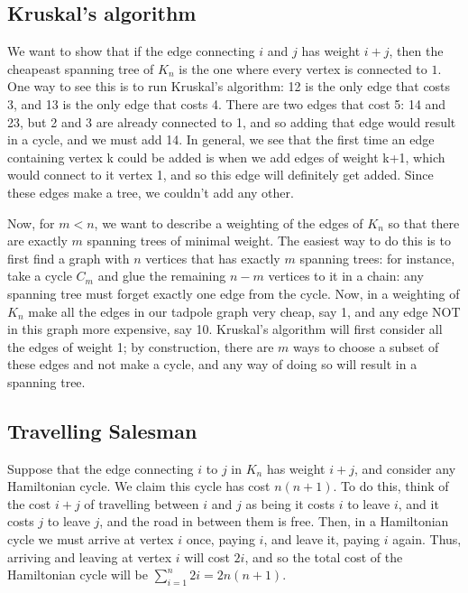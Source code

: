 \documentclass{amsart}
\begin{document}
\subsection{Kruskal's algorithm}

We want to show that if the edge connecting $i$ and $j$ has weight $i+j$, then the cheapeast spanning tree of $K_n$ is the one where every vertex is connected to $1$.  One way to see this is to run Kruskal's algorithm:  12 is the only edge that costs 3, and 13 is the only edge that costs 4.  There are two edges that cost 5: 14 and 23, but 2 and 3 are already connected to 1, and so adding that edge would result in a cycle, and we must add 14.  In general, we see that the first time an edge containing vertex k could be added is when we add edges of weight k+1, which would connect to it vertex 1, and so this edge will definitely get added.  Since these edges make a tree, we couldn't add any other.

Now, for $m<n$, we want to describe a weighting of the edges of $K_n$ so that there are exactly $m$ spanning trees of minimal weight.  The easiest way to do this is to first find a graph with $n$ vertices that has exactly $m$ spanning trees: for instance, take a cycle $C_m$ and glue the remaining $n-m$ vertices to it in a chain: any spanning tree must forget exactly one edge from the cycle.  Now, in a weighting of $K_n$ make all the edges in our tadpole graph very cheap, say 1, and any edge NOT in this graph more expensive, say 10.  Kruskal's algorithm will first consider all the edges of weight 1; by construction, there are $m$ ways to choose a subset of these edges and not make a cycle, and any way of doing so will result in a spanning tree.

\subsection{Travelling Salesman}

    Suppose that the edge connecting $i$ to $j$ in $K_n$ has weight $i+j$, and consider any Hamiltonian cycle.  We claim this cycle has cost $n(n+1)$.  To do this, think of the cost $i+j$ of travelling between $i$ and $j$ as being it costs $i$ to leave $i$, and it costs $j$ to leave $j$, and the road in between them is free.  Then, in a Hamiltonian cycle we must arrive at vertex $i$ once, paying $i$, and leave it, paying $i$ again.  Thus, arriving and leaving at vertex $i$ will cost $2i$, and so the total cost of the Hamiltonian cycle will be $\sum_{i=1}^n 2i=2n(n+1)$.
\end{document}
